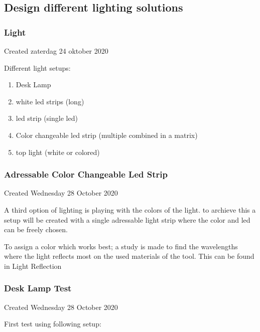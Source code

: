 \subsection{Design different lighting solutions}

		\subsubsection{Light}

Created zaterdag 24 oktober 2020



Different light setups:

\begin{enumerate}
\item Desk Lamp
\item white led strips (long) 
\item  led strip (single led)
\item Color changeable led strip (multiple combined in a matrix)
\item top light (white or colored)
\end{enumerate}

\subsubsection{Adressable Color Changeable Led Strip}

Created Wednesday 28 October 2020



A third option of lighting is playing with the colors of the light. to archieve this a setup will be created with a single adressable light strip where the color and led can be freely chosen. 



To assign a color which works best; a study is made to find the wavelengths where the light reflects most on the used materials of the tool. This can be found in  Light Reflection


		\subsubsection{Desk Lamp Test}

Created Wednesday 28 October 2020



First test using following setup:



